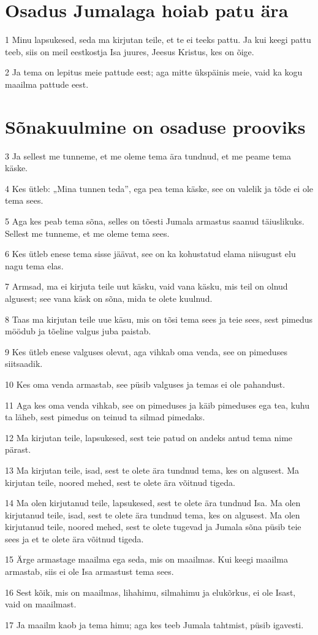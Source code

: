 \section*{Osadus Jumalaga hoiab patu ära}

\par 1 Minu lapsukesed, seda ma kirjutan teile, et te ei teeks pattu. Ja kui keegi pattu teeb, siis on meil eestkostja Isa juures, Jeesus Kristus, kes on õige.
\par 2 Ja tema on lepitus meie pattude eest; aga mitte ükspäinis meie, vaid ka kogu maailma pattude eest.

\section*{Sõnakuulmine on osaduse prooviks}

\par 3 Ja sellest me tunneme, et me oleme tema ära tundnud, et me peame tema käske.
\par 4 Kes ütleb: „Mina tunnen teda”, ega pea tema käske, see on valelik ja tõde ei ole tema sees.
\par 5 Aga kes peab tema sõna, selles on tõesti Jumala armastus saanud täiuslikuks. Sellest me tunneme, et me oleme tema sees.
\par 6 Kes ütleb enese tema sisse jäävat, see on ka kohustatud elama niisugust elu nagu tema elas.
\par 7 Armsad, ma ei kirjuta teile uut käsku, vaid vana käsku, mis teil on olnud algusest; see vana käsk on sõna, mida te olete kuulnud.
\par 8 Taas ma kirjutan teile uue käsu, mis on tõsi tema sees ja teie sees, sest pimedus möödub ja tõeline valgus juba paistab.
\par 9 Kes ütleb enese valguses olevat, aga vihkab oma venda, see on pimeduses siitsaadik.
\par 10 Kes oma venda armastab, see püsib valguses ja temas ei ole pahandust.
\par 11 Aga kes oma venda vihkab, see on pimeduses ja käib pimeduses ega tea, kuhu ta läheb, sest pimedus on teinud ta silmad pimedaks.
\par 12 Ma kirjutan teile, lapsukesed, sest teie patud on andeks antud tema nime pärast.
\par 13 Ma kirjutan teile, isad, sest te olete ära tundnud tema, kes on algusest. Ma kirjutan teile, noored mehed, sest te olete ära võitnud tigeda.
\par 14 Ma olen kirjutanud teile, lapsukesed, sest te olete ära tundnud Isa. Ma olen kirjutanud teile, isad, sest te olete ära tundnud tema, kes on algusest. Ma olen kirjutanud teile, noored mehed, sest te olete tugevad ja Jumala sõna püsib teie sees ja et te olete ära võitnud tigeda.
\par 15 Ärge armastage maailma ega seda, mis on maailmas. Kui keegi maailma armastab, siis ei ole Isa armastust tema sees.
\par 16 Sest kõik, mis on maailmas, lihahimu, silmahimu ja elukõrkus, ei ole Isast, vaid on maailmast.
\par 17 Ja maailm kaob ja tema himu; aga kes teeb Jumala tahtmist, püsib igavesti.

